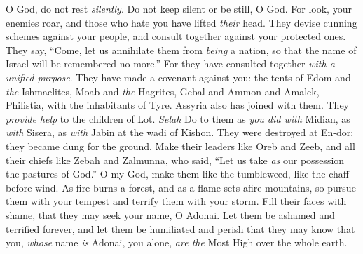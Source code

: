 \begin{biblechapter} %
 O God, do not rest \textit{silently}. 
Do not keep silent or be still, O God.
\verse For look, your enemies roar, 
and those who hate you have lifted \textit{their} head.
\verse They devise cunning schemes against your people, 
and consult together against your protected ones.
\verse They say, “Come, let us annihilate them from \textit{being} a nation, 
so that the name of Israel will be remembered no more.”
\verse For they have consulted together \textit{with a unified purpose}. 
They have made a covenant against you:
\verse the tents of Edom and \textit{the} Ishmaelites, 
Moab and \textit{the} Hagrites,
\verse Gebal and Ammon and Amalek, 
Philistia, with the inhabitants of Tyre.
\verse Assyria also has joined with them. 
They \textit{provide help} to the children of Lot. \textit{Selah}
\verse Do to them as \textit{you did with} Midian, 
as \textit{with} Sisera, as \textit{with} Jabin at the wadi of Kishon.
\verse They were destroyed at En-dor; 
they became dung for the ground.
\verse Make their leaders like Oreb and Zeeb, 
and all their chiefs like Zebah and Zalmunna,
\verse who said, “Let us take \textit{as} our possession 
the pastures of God.”
\verse O my God, make them like the tumbleweed, 
like the chaff before wind.
\verse As fire burns a forest, 
and as a flame sets afire mountains,
\verse so pursue them with your tempest 
and terrify them with your storm.
\verse Fill their faces with shame, 
that they may seek your name, O Adonai.
\verse Let them be ashamed and terrified forever, 
and let them be humiliated and perish
\verse that they may know that you, 
\textit{whose} name \textit{is} Adonai, you alone, 
\textit{are the} Most High over the whole earth.
\end{biblechapter}

